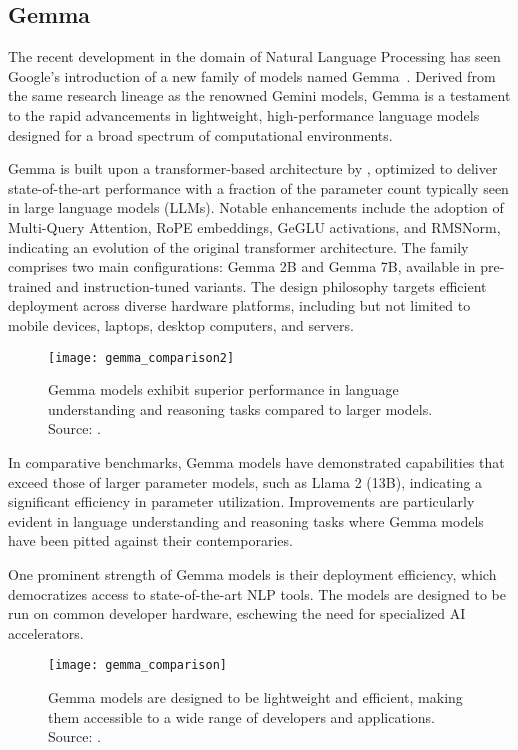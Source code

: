 \subsection{Gemma}
\label{subsec:gemma}

The recent development in the domain of Natural Language Processing has seen Google's introduction of a new family of models named Gemma~\cite{gemma_google_ai, gemmateam2024gemma}.
Derived from the same research lineage as the renowned Gemini models, Gemma is a testament to the rapid advancements in lightweight, high-performance language models designed for a broad spectrum of computational environments.

Gemma is built upon a transformer-based architecture by \textcite{vaswani2023attention}, optimized to deliver state-of-the-art performance with a fraction of the parameter count typically seen in large language models (LLMs).
Notable enhancements include the adoption of Multi-Query Attention, RoPE embeddings, GeGLU activations, and RMSNorm, indicating an evolution of the original transformer architecture.
The family comprises two main configurations: Gemma 2B and Gemma 7B, available in pre-trained and instruction-tuned variants.
The design philosophy targets efficient deployment across diverse hardware platforms, including but not limited to mobile devices, laptops, desktop computers, and servers.

\begin{figure}[ht!]
	\centering
	\texttt{[image: gemma\_comparison2]}
	\caption{Gemma models exhibit superior performance in language understanding and reasoning tasks compared to larger models. Source: \textcite{gemmateam2024gemma}.}
	\label{fig:gemma-comparison2}
\end{figure}

In comparative benchmarks, Gemma models have demonstrated capabilities that exceed those of larger parameter models, such as Llama 2 (13B), indicating a significant efficiency in parameter utilization.
Improvements are particularly evident in language understanding and reasoning tasks where Gemma models have been pitted against their contemporaries.

One prominent strength of Gemma models is their deployment efficiency, which democratizes access to state-of-the-art NLP tools.
The models are designed to be run on common developer hardware, eschewing the need for specialized AI accelerators.

\begin{figure}[ht!]
	\centering
	\texttt{[image: gemma\_comparison]}
	\caption{Gemma models are designed to be lightweight and efficient, making them accessible to a wide range of developers and applications. Source: \textcite{gemma_google_ai}.}
	\label{fig:gemma-comparison}
\end{figure}

